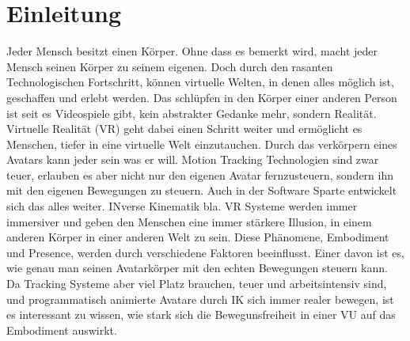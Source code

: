 \chapter{Einleitung}

Jeder Mensch besitzt einen Körper. Ohne dass es bemerkt wird, macht jeder Mensch seinen Körper zu seinem eigenen. Doch durch den rasanten Technologischen Fortschritt, können virtuelle Welten, in denen alles möglich ist, geschaffen und erlebt werden. Das schlüpfen in den Körper einer anderen Person ist seit es Videospiele gibt, kein abstrakter Gedanke mehr, sondern Realität. Virtuelle Realität (VR) geht dabei einen Schritt weiter und ermöglicht es Menschen, tiefer in eine virtuelle Welt einzutauchen. Durch das verkörpern eines Avatars kann jeder sein was er will. Motion Tracking Technologien sind zwar teuer, erlauben es aber nicht nur den eigenen Avatar fernzusteuern, sondern ihn mit den eigenen Bewegungen zu steuern. Auch in der Software Sparte entwickelt sich das alles weiter. INverse Kinematik bla.
VR Systeme werden immer immersiver und geben den Menschen eine immer stärkere Illusion, in einem anderen Körper in einer anderen Welt zu sein. Diese Phänomene, Embodiment und Presence, werden durch verschiedene Faktoren beeinflusst. Einer davon ist es, wie genau man seinen Avatarkörper mit den echten Bewegungen steuern kann. Da Tracking Systeme aber viel Platz brauchen, teuer und arbeitsintensiv sind, und programmatisch animierte Avatare durch IK sich immer realer bewegen, ist es interessant zu wissen, wie stark sich die Bewegunsfreiheit in einer VU auf das Embodiment auswirkt. 


